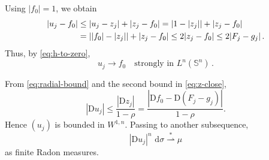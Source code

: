 \documentclass[11pt,reqno]{amsart}
\numberwithin{equation}{section}
\newcommand{\Sph}{\mathbb S}
\newcommand{\D}{\mathrm D}
\newcommand{\dd}{\,\mathrm d}
\newcommand{\weakstar}{\mathrel{\stackrel{*}{\rightharpoonup}}}
\begin{document}
Using $|f_0|=1$, we obtain
\begin{align}\label{eq:u-f0-pointwise}
    |u_j - f_0| & \le |u_j - z_j| + |z_j - f_0| = |1-|z_j|| + |z_j - f_0| \notag \\
    & = ||f_0|-|z_j|| + |z_j - f_0| \leq 2 |z_j - f_0| \leq 2 |F_j - g_j| \,.
\end{align}
Thus, by \eqref{eq:h-to-zero},
\begin{equation}\label{eq:u-to-f0}
  u_j\to f_0\quad\text{strongly in }L^n(\Sph^n) \,.
\end{equation}

From \eqref{eq:radial-bound} and the second bound in \eqref{eq:z-close},
\begin{equation}\label{eq:Du-bound}
  |\D u_j|
  \le\frac{|\D z_j|}{1-\rho}
  =\frac{|\D f_0-\D (F_j-g_j)|}{1-\rho}.
\end{equation}
Hence $(u_j)$ is bounded in $W^{1,n}$.  Passing to another subsequence,
\begin{equation}\label{eq:mu-limit}
  |\D u_j|^n\,\dd\sigma\weakstar\mu
\end{equation}
as finite Radon measures.

\end{document}
